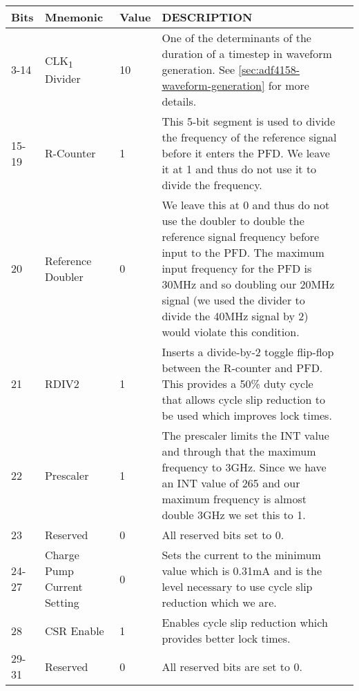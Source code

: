 \documentclass{default}
\begin{document}
\label{tab:adf4158-reg-map-2}
\begin{tabularx}{\textwidth}{l l l X>{\raggedright\arraybackslash}X}
  \caption{R-DIVIDER REGISTER(R2) MAP} \\
  \toprule
  \textbf{Bits} & \textbf{Mnemonic} & \textbf{Value} & \textbf{DESCRIPTION} \\
  \midrule

  \endhead

  3-14 & CLK\textsubscript{1} Divider & 10 & One of the determinants of the duration of a timestep in
  waveform generation. See \cref{sec:adf4158-waveform-generation} for more details. \\
  15-19 & R-Counter & 1 & This 5-bit segment is used to divide the frequency of the reference signal
  before it enters the PFD. We leave it at 1 and thus do not use it to divide the frequency. \\
  20 & Reference Doubler & 0 & We leave this at 0 and thus do not use the doubler to double the
  reference signal frequency before input to the PFD. The maximum input frequency for the PFD is
  30MHz and so doubling our 20MHz signal (we used the divider to divide the 40MHz signal by 2) would
  violate this condition. \\
  21 & RDIV2 & 1 & Inserts a divide-by-2 toggle flip-flop between the R-counter and PFD. This
  provides a 50\% duty cycle that allows cycle slip reduction to be used which improves lock times. \\
  22 & Prescaler & 1 & The prescaler limits the INT value and through that the maximum frequency to
  3GHz. Since we have an INT value of 265 and our maximum frequency is almost double 3GHz we set
  this to 1. \\
  23 & Reserved & 0 & All reserved bits set to 0. \\
  24-27 & Charge Pump Current Setting & 0 & Sets the current to the minimum value which is 0.31mA
  and is the level necessary to use cycle slip reduction which we are. \\
  28 & CSR Enable & 1 & Enables cycle slip reduction which provides better lock times. \\
  29-31 & Reserved & 0 & All reserved bits are set to 0. \\

  \bottomrule
\end{tabularx}
\end{document}
